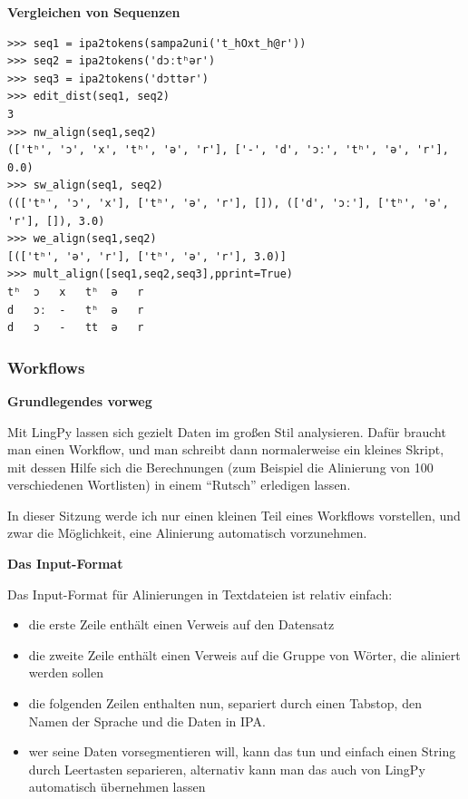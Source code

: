 \par\noindent\textbf{Vergleichen von Sequenzen}

\begin{verbatim}
>>> seq1 = ipa2tokens(sampa2uni('t_hOxt_h@r'))
>>> seq2 = ipa2tokens('dɔːtʰər')
>>> seq3 = ipa2tokens('dɔttər')
>>> edit_dist(seq1, seq2)
3
>>> nw_align(seq1,seq2)
(['tʰ', 'ɔ', 'x', 'tʰ', 'ə', 'r'], ['-', 'd', 'ɔː', 'tʰ', 'ə', 'r'], 0.0)
>>> sw_align(seq1, seq2)
((['tʰ', 'ɔ', 'x'], ['tʰ', 'ə', 'r'], []), (['d', 'ɔː'], ['tʰ', 'ə', 'r'], []), 3.0)
>>> we_align(seq1,seq2)
[(['tʰ', 'ə', 'r'], ['tʰ', 'ə', 'r'], 3.0)]
>>> mult_align([seq1,seq2,seq3],pprint=True)
tʰ  ɔ   x   tʰ  ə   r
d   ɔː  -   tʰ  ə   r
d   ɔ   -   tt  ə   r
\end{verbatim}



\subsubsection{\texorpdfstring{{Workflows}}{Workflows}}

\par\noindent\textbf{Grundlegendes vorweg}

Mit LingPy lassen sich gezielt Daten im großen Stil analysieren. Dafür
braucht man einen Workflow, und man schreibt dann normalerweise ein
kleines Skript, mit dessen Hilfe sich die Berechnungen (zum Beispiel die
Alinierung von 100 verschiedenen Wortlisten) in einem ``Rutsch''
erledigen lassen.

In dieser Sitzung werde ich nur einen kleinen Teil eines Workflows
vorstellen, und zwar die Möglichkeit, eine Alinierung automatisch
vorzunehmen.




\par\noindent\textbf{Das Input-Format}

Das Input-Format für Alinierungen in Textdateien ist relativ einfach:

\begin{itemize}
\itemsep1pt\parskip0pt
\item
  die erste Zeile enthält einen Verweis auf den Datensatz
\item
  die zweite Zeile enthält einen Verweis auf die Gruppe von Wörter, die
  aliniert werden sollen
\item
  die folgenden Zeilen enthalten nun, separiert durch einen Tabstop, den
  Namen der Sprache und die Daten in IPA.
\item
  wer seine Daten vorsegmentieren will, kann das tun und einfach einen
  String durch Leertasten separieren, alternativ kann man das auch von
  LingPy automatisch übernehmen lassen
\end{itemize}




